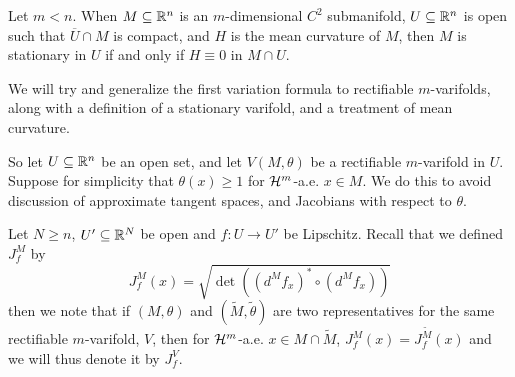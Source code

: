 Let $m<n$. When $M \subseteq \mathbb{R}^n$ is an $m$-dimensional $C^2$ submanifold, $U \subseteq \mathbb{R}^n$ is open such that $\overline{U} \cap M$ is compact, and $H$ is the mean curvature of $M$, then $M$ is stationary in $U$ if and only if $H \equiv 0$ in $M \cap U$.

We will try and generalize the first variation formula to rectifiable $m$-varifolds, along with a definition of a stationary varifold, and a treatment of mean curvature.

So let $U \subseteq \mathbb{R}^n$ be an open set, and let $V(M,\theta)$ be a rectifiable $m$-varifold in $U$. Suppose for simplicity that $\theta(x) \ge 1$ for $\mathcal{H}^m$-a.e. $x \in M$. We do this to avoid discussion of approximate tangent spaces, and Jacobians with respect to $\theta$.

Let $N \ge n$, $U'\subseteq \mathbb{R}^N$ be open and $f:U \to U'$ be Lipschitz. Recall that we defined $J_f^M$ by
\[
    J^M_f(x) = \sqrt{ \det((d^Mf_x)^* \circ (d^M f_x)) }
\]
then we note that if $(M,\theta)$ and $(\tilde M, \tilde \theta)$ are two representatives for the same rectifiable $m$-varifold, $V$, then for $\mathcal{H}^m$-a.e. $x \in M \cap \tilde M$, $J_f^M(x)=J_f^{\tilde M}(x)$ and we will thus denote it by $J_f^V$.

